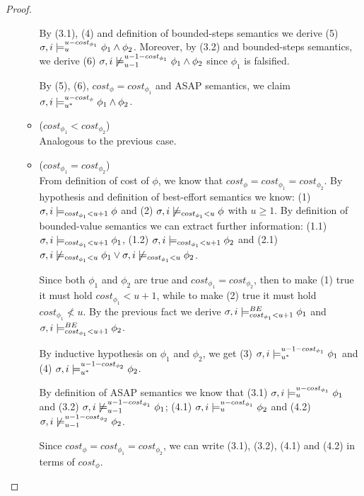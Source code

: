 \begin{theorem}
\begin{proof}
\begin{itemize}
\begin{itemize}
        By (3.1), (4) and definition of bounded-steps semantics we derive (5) $\sigma,i \models_{u}^{u-cost_{\phi_1}} \phi_1 \land \phi_2$.
        Moreover, by (3.2) and bounded-steps semantics, we derive (6) $\sigma, i \not\models_{u-1}^{u-1-cost_{\phi_1}} \phi_1 \land \phi_2$ since $\phi_1$ is falsified.
        
        By (5), (6), $cost_\phi = cost_{\phi_1}$ and ASAP semantics, we claim $\sigma,i \models_{{u}^*}^{u-cost_\phi} \phi_1 \land \phi_2$.

        \item ($cost_{\phi_1} < cost_{\phi_2}$) \\
        Analogous to the previous case.

        \item ($cost_{\phi_1} = cost_{\phi_2}$) \\
        From definition of cost of $\phi$, we know that $cost_\phi = cost_{\phi_1} = cost_{\phi_2}$.
        By hypothesis and definition of best-effort semantics we know:
        (1) $\sigma,i \models_{cost_{\phi_1} < u + 1} \phi$ and 
        (2) $\sigma,i \not\models_{cost_{\phi_1} < u} \phi$ with $u \geq 1$.
        By definition of bounded-value semantics we can extract further information: 
        (1.1) $\sigma,i \models_{cost_{\phi_1} < u + 1} \phi_1$, 
        (1.2) $\sigma,i \models_{cost_{\phi_1} < u + 1} \phi_2$ and 
        (2.1) $\sigma,i \not\models_{cost_{\phi_1} < u} \phi_1 \lor \sigma,i \not\models_{cost_{\phi_1} < u} \phi_2$.

        Since both $\phi_1$ and $\phi_2$ are true and $cost_{\phi_1} = cost_{\phi_2}$, then to make (1) true it must hold $cost_{\phi_1} < u + 1$, while to make (2) true it must hold $cost_{\phi_1} \not< u$.
        By the previous fact we derive $\sigma,i \models_{cost_{\phi_1} < u + 1}^{BE} \phi_1$ and $\sigma,i \models_{cost_{\phi_1} < u + 1}^{BE} \phi_2$.

        By inductive hypothesis on $\phi_1$ and $\phi_2$, we get (3) $\sigma,i \models_{{u}^*}^{u-1-cost_{\phi_1}} \phi_1$ and (4) $\sigma,i \models_{{u}^*}^{u-1-cost_{\phi_2}} \phi_2$.

        By definition of ASAP semantics we know that 
        (3.1) $\sigma, i \models_{u}^{u-cost_{\phi_1}} \phi_1$ and 
        (3.2) $\sigma, i \not\models_{u-1}^{u-1-cost_{\phi_1}} \phi_1$; 
        (4.1) $\sigma, i \models_{u}^{u-cost_{\phi_1}} \phi_2$ and 
        (4.2) $\sigma, i \not\models_{u-1}^{u-1-cost_{\phi_2}} \phi_2$.

        Since $cost_\phi = cost_{\phi_1} = cost_{\phi_2}$, we can write (3.1), (3.2), (4.1) and (4.2) in terms of $cost_\phi$.


\end{itemize}
\end{itemize}
\end{proof}
\end{theorem}

